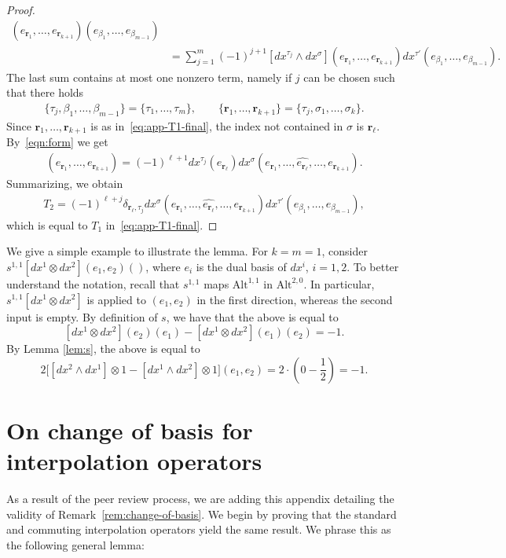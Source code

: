 \documentclass[final]{amsart}%
\newcommand{\0}{\mathaccent23}
\newcommand \alt{\mathrm{Alt}}
\newcommand{\br}{\mathbf r}
\begin{document}
\begin{proof}
\begin{align*}
    (e_{\br_1},\dots,e_{\br_{k+1}})
    (e_{\beta_1},\dots,e_{\beta_{m-1}})\\
    &= \sum_{j=1}^m (-1)^{j+1}
    \left[dx^{\tau_j} \wedge dx^\sigma\right]
    (e_{\br_1},\dots,e_{\br_{k+1}})
    dx^{\tau'}
    (e_{\beta_1},\dots,e_{\beta_{m-1}}).
\end{align*}
The last sum contains at most one nonzero term, namely if $j$ can be chosen such that there holds
\begin{gather}
    \{\tau_j,\beta_1,\dots,\beta_{m-1}\}
    =\{\tau_1,\dots,\tau_m\},
    \qquad
    \{\br_1,\dots,\br_{k+1}\}
    =\{\tau_j,\sigma_1,\dots,\sigma_k\}.
\end{gather}
Since $\br_1,\dots,\br_{k+1}$ is as in~\eqref{eq:app-T1-final}, the index not contained in $\sigma$ is $\br_\ell$. By~\eqref{eqn:form} we get
\begin{gather}
    [dx^{\tau_j} \wedge dx^\sigma]
    (e_{\br_1},\dots,e_{\br_{k+1}})
    = (-1)^{\ell+1} dx^{\tau_j}(e_{\br_\ell})
    dx^\sigma(e_{\br_1},\dots,\widehat{e_{\br_\ell}},\dots,e_{\br_{k+1}}).
\end{gather}
Summarizing, we obtain
\begin{gather}
    \label{eq:app-T2-final}
    T_2 = (-1)^{\ell+j} \delta_{\br_\ell,\tau_j}
    dx^\sigma(e_{\br_1},\dots,\widehat{e_{\br_\ell}},\dots, e_{\br_{k+1}})
    dx^{\tau'}(e_{\beta_1},\dots,e_{\beta_{m-1}}),
\end{gather}
which is equal to $T_1$ in~\eqref{eq:app-T1-final}.
\end{proof}

We give a simple example to illustrate the lemma. For $k=m=1$, consider $s^{1, 1}[dx^1\otimes dx^2](e_1, e_2)()$, where $e_i$ is the dual basis of $dx^i$, $i=1, 2$. 
To better understand the notation, recall that $s^{1,1}$ maps $\alt^{1,1}$ in $\alt^{2,0}$. In particular, $s^{1, 1}[dx^1\otimes dx^2]$ is applied to $(e_1, e_2)$ in the first direction, whereas the second input is empty.
By definition of $s$, we have that the above is equal to
$$
[dx^1\otimes dx^2](e_2)(e_1)-[dx^1\otimes dx^2](e_1)(e_2)=-1.
$$
By Lemma \ref{lem:s}, the above is equal to 
$$
2\bigl[[dx^2\wedge dx^1]\otimes 1-[dx^1\wedge dx^2]\otimes 1\bigr](e_1, e_2)=2\cdot (0-\frac{1}{2})=-1.
$$

\section{On change of basis for interpolation operators}
\label{app:interpolation}
As a result of the peer review process, we are adding this appendix detailing the validity of  Remark~\ref{rem:change-of-basis}. We begin by proving that the standard and commuting interpolation operators yield the same result. We phrase this as the following general lemma:
\end{document}
